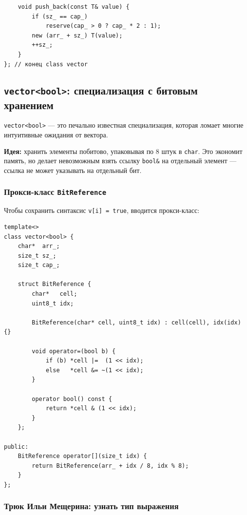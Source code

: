 \documentclass[a4paper,12pt]{article}
\begin{document}
\begin{lstlisting}
    void push_back(const T& value) {
        if (sz_ == cap_)
            reserve(cap_ > 0 ? cap_ * 2 : 1);
        new (arr_ + sz_) T(value);
        ++sz_;
    }
}; // конец class vector
\end{lstlisting}

\subsection{\texttt{vector<bool>}: специализация с битовым хранением}

\texttt{vector<bool>} --- это печально известная специализация,
которая ломает многие интуитивные ожидания от вектора.

\textbf{Идея:} хранить элементы побитово, упаковывая по 8 штук в \texttt{char}.
Это экономит память, но делает невозможным взять ссылку \texttt{bool\&} на
отдельный элемент --- ссылка не может указывать на отдельный бит.

\subsubsection{Прокси-класс \texttt{BitReference}}

Чтобы сохранить синтаксис \texttt{v[i] = true}, вводится прокси-класс:

\begin{lstlisting}
template<>
class vector<bool> {
    char*  arr_;
    size_t sz_;
    size_t cap_;

    struct BitReference {
        char*   cell;
        uint8_t idx;

        BitReference(char* cell, uint8_t idx) : cell(cell), idx(idx) {}

        void operator=(bool b) {
            if (b) *cell |=  (1 << idx);
            else   *cell &= ~(1 << idx);
        }

        operator bool() const {
            return *cell & (1 << idx);
        }
    };

public:
    BitReference operator[](size_t idx) {
        return BitReference(arr_ + idx / 8, idx % 8);
    }
};
\end{lstlisting}

\subsubsection{Трюк Ильи Мещерина: узнать тип выражения}
\end{document}
